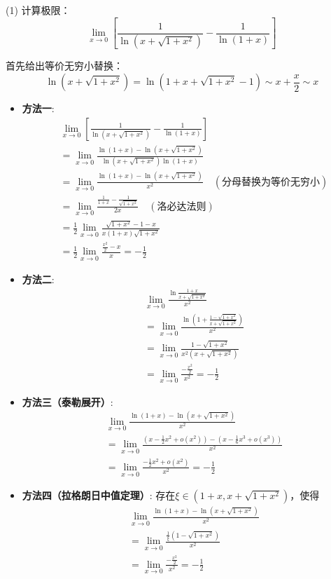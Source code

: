 \documentclass[12pt, a4paper, oneside, UTF8]{ctexbook}
\begin{document}
\begin{solution}
(1) 计算极限：
$$ \lim_{x \to 0}\left[\frac{1}{\ln(x+\sqrt{1+x^2})}-\frac{1}{\ln(1+x)}\right] $$

首先给出等价无穷小替换：
$$ \ln\left(x+\sqrt{1+x^{2}}\right)=\ln\left(1+x+\sqrt{1+x^{2}}-1\right)\sim x+\frac{x}{2}\sim x $$

\begin{itemize}
\item \textbf{方法一}:
\begin{align*}
&\lim_{x \to 0}\left[\frac{1}{\ln(x+\sqrt{1+x^2})}-\frac{1}{\ln(1+x)}\right] \\
&= \lim_{x \to 0}\frac{\ln(1+x)-\ln(x+\sqrt{1+x^2})}{\ln(x+\sqrt{1+x^2})\ln(1+x)} \\
&= \lim_{x \to 0}\frac{\ln(1+x)-\ln(x+\sqrt{1+x^2})}{x^2} \quad (\text{分母替换为等价无穷小}) \\
&= \lim_{x \to 0}\frac{\frac{1}{1+x}-\frac{1}{\sqrt{1+x^2}}}{2x} \quad (\text{洛必达法则}) \\
&= \frac{1}{2}\lim_{x \to 0}\frac{\sqrt{1+x^2}-1-x}{x(1+x)\sqrt{1+x^2}} \\
&= \frac{1}{2}\lim_{x \to 0}\frac{\frac{x^2}{2}-x}{x} = -\frac{1}{2}
\end{align*}

\item \textbf{方法二}:
\begin{align*}
&\lim_{x \to 0}\frac{\ln\frac{1+x}{x+\sqrt{1+x^2}}}{x^2} \\
&= \lim_{x \to 0}\frac{\ln\left(1+\frac{1-\sqrt{1+x^2}}{x+\sqrt{1+x^2}}\right)}{x^2} \\
&= \lim_{x \to 0}\frac{1-\sqrt{1+x^2}}{x^2(x+\sqrt{1+x^2})} \\
&= \lim_{x \to 0}\frac{-\frac{x^2}{2}}{x^2} = -\frac{1}{2}
\end{align*}

\item \textbf{方法三（泰勒展开）}:
\begin{align*}
&\lim_{x \to 0}\frac{\ln(1+x)-\ln(x+\sqrt{1+x^2})}{x^2} \\
&= \lim_{x \to 0}\frac{\left(x-\frac{1}{2}x^2+o(x^2)\right)-\left(x-\frac{1}{6}x^3+o(x^3)\right)}{x^2} \\
&= \lim_{x \to 0}\frac{-\frac{1}{2}x^2+o(x^2)}{x^2} = -\frac{1}{2}
\end{align*}

\item \textbf{方法四（拉格朗日中值定理）}:
存在$\xi\in(1+x, x+\sqrt{1+x^2})$，使得
\begin{align*}
&\lim_{x \to 0}\frac{\ln(1+x)-\ln(x+\sqrt{1+x^2})}{x^2} \\
&= \lim_{x \to 0}\frac{\frac{1}{\xi}(1-\sqrt{1+x^2})}{x^2} \\
&= \lim_{x \to 0}\frac{-\frac{x^2}{2}}{x^2} = -\frac{1}{2}
\end{align*}
\end{itemize}


\end{solution}
\end{document}
